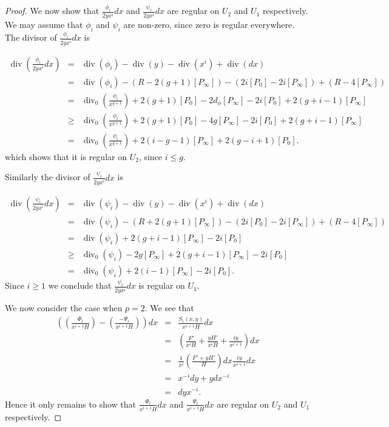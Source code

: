 \documentclass[draft, 11pt]{article} %
\theoremstyle{plain}
\theoremstyle{remark}
\DeclareMathOperator{\di}{div}
\begin{document}
\begin{proof}
We now show that $\frac{\phi_i}{2yx^i}dx$ and $\frac{\psi_i}{2yx^i}dx$ are regular on $U_2$ and $U_1$ respectively.
We may assume that $\phi_i$ and $\psi_i$ are non-zero, since zero is regular everywhere.
The divisor of $\frac{\phi_i}{2yx^i}dx$ is

\begin{eqnarray*}
\di\left( \frac{\phi_i}{2yx^i}dx \right) & = & \di(\phi_i) -\di(y) - \di(x^i) + \di (dx) \\
& = & \di(\phi_i) - ( R - 2(g+1)[P_\infty]) - (2i[P_0] - 2i[P_\infty]) + (R - 4[P_\infty]) \\
& = & \di_0\left( \frac{\phi_i}{x^{g+1}}\right) + 2(g+1)[P_0] - 2d_\phi[P_\infty] - 2i[P_0] + 2(g+i-1)[P_\infty] \\
& \geq & \di_0\left( \frac{\phi_i}{x^{g+1}}\right) + 2(g+1)[P_0] - 4g[P_\infty] - 2i[P_0] + 2(g+i-1)[P_\infty] \\
& = & \di_0\left( \frac{\phi_i}{x^{g+1}} \right) + 2(i-g-1)[P_\infty] + 2(g-i+1)[P_0].
\end{eqnarray*}
which shows that it is regular on $U_2$, since $i \leq g$.

Similarly the divisor of $\frac{\psi_i}{2yx^i}dx$ is

\begin{eqnarray*}
\di \left( \frac{\psi_i}{2yx^i}dx\right) & = & \di(\psi_i) - \di(y) - \di(x^i) + \di (dx) \\
& = & \di (\psi_i ) -(R + 2(g+1)[P_\infty]) - (2i[P_0] - 2i[P_\infty]) + (R -4[P_\infty]) \\
& = & \di(\psi_i) + 2(g+i-1)[P_\infty] -2i[P_0] \\
& \geq & \di_0(\psi_i) - 2g[P_\infty] + 2(g+i-1)[P_\infty] -2i[P_0] \\
& = & \di_0(\psi_i) + 2(i-1)[P_\infty] - 2i[P_0].
\end{eqnarray*}
Since $i\geq 1$ we conclude that $\frac{\psi_i}{2yx^i}dx$ is regular on $U_1$.


We now consider the case when $p=2$.
We see that
\begin{eqnarray*}
\left( \left( \frac{\Phi_i}{x^{i+1}H} \right) - \left( \frac{- \Psi_i}{x^{i+1}H} \right) \right) dx & = & \frac{S_i(x,y)}{x^{i+1}H}dx \\
& = & \left( \frac{F'}{x^iH} + \frac{yH'}{x^iH} + \frac{iy}{x^{i+1}} \right) dx \\
& = & \frac{1}{x^i}\left( \frac{F' + yH'}{H} \right) dx \frac{iy}{x^{i+1}}dx \\
& = & x^{-i}dy + ydx^{-i} \\
& = & dyx^{-i}.
\end{eqnarray*}
Hence it only remains to show that $\frac{\Phi_i}{x^{i+1}H}dx$ and $\frac{\Psi_i}{x^{i+1}H}dx$ are regular on $U_2$ and $U_1$ respectively.



\end{proof}
\end{document}
